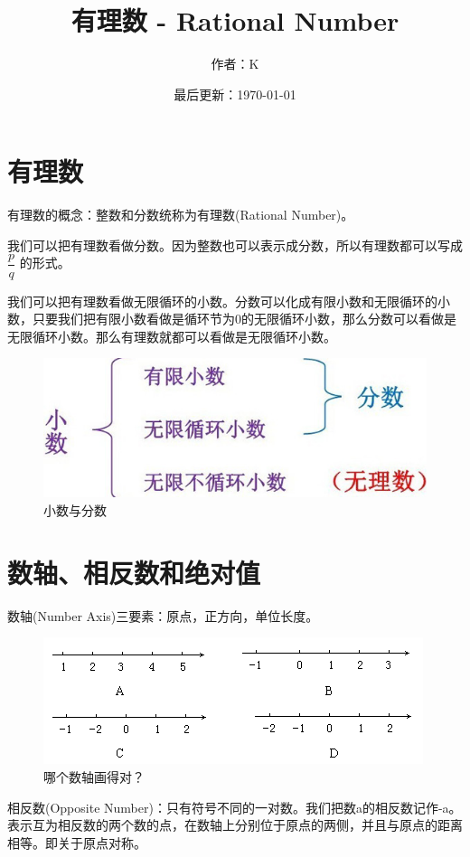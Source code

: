\documentclass[UTF8,12pt]{ctexart}
\title{有理数 - Rational Number}
\author{作者：K}
\date{最后更新：\today}
\begin{document}
\maketitle
\newpage

\section{有理数}
有理数的概念：整数和分数统称为有理数(Rational Number)。

我们可以把有理数看做分数。因为整数也可以表示成分数，所以有理数都可以写成 $ \dfrac{p}{q} $ 的形式。

我们可以把有理数看做无限循环的小数。分数可以化成有限小数和无限循环的小数，只要我们把有限小数看做是循环节为0的无限循环小数，那么分数可以看做是无限循环小数。那么有理数就都可以看做是无限循环小数。

\begin{figure}[htb]
\centering
\includegraphics[width = .5\textwidth]{decimal.jpg}
\caption{小数与分数}
\label{fig:decimal}
\end{figure}

\newpage
\section{数轴、相反数和绝对值} 

数轴(Number Axis)三要素：原点，正方向，单位长度。

\begin{figure}[htb]
\centering
\includegraphics[width = .85\textwidth]{number-axis.png}
\caption{哪个数轴画得对？}
\label{fig:number-axis}
\end{figure}

相反数(Opposite Number)：只有符号不同的一对数。我们把数a的相反数记作-a。表示互为相反数的两个数的点，在数轴上分别位于原点的两侧，并且与原点的距离相等。即关于原点对称。
\end{document}
